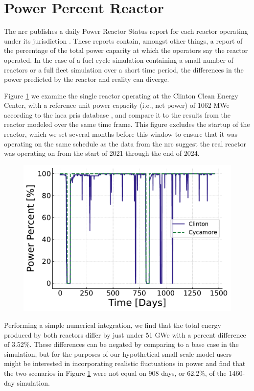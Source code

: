 \section{Power Percent Reactor}
\label{sec:pp_reactor}

The \gls{nrc} publishes a daily Power Reactor Status report for each reactor operating under its jurisdiction \cite{nrc_power_2025}. These reports contain, amongst other things, a report of the percentage of the total power capacity at which the operators say the reactor operated. In the case of a fuel cycle simulation containing a small number of reactors or a full fleet simulation over a short time period, the differences in the power predicted by the \cycamore reactor and reality can diverge.

Figure \ref{fig:pp_full} we examine the single reactor operating at the Clinton Clean Energy Center, with a reference unit power capacity (i.e., net power) of 1062 MWe according to the \gls{iaea} \gls{pris} database \cite{IAEA_PRIS}, and compare it to the results from the \cycamore reactor modeled over the same time frame. This figure excludes the startup of the \cycamore reactor, which we set several months before this window to ensure that it was operating on the same schedule as the data from the \gls{nrc} suggest the real reactor was operating on from the start of 2021 through the end of 2024.

\begin{figure}
  \centering
  \includegraphics[scale=0.7]{images/power_reactor/power_percent_clinton_fake.pdf}
  \caption{}
  \label{fig:pp_full}
\end{figure}

Performing a simple numerical integration, we find that the total energy produced by both reactors differ by just under 51 GWe with a percent difference of 3.52\%. These differences can be negated by comparing to a base case in the simulation, but for the purposes of our hypothetical small scale model users might be interested in incorporating realistic fluctuations in power and find that the two scenarios in Figure \ref{fig:pp_full} were not equal on 908 days, or 62.2\%, of the 1460-day simulation.

